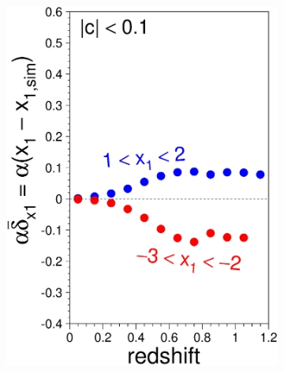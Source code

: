 \documentclass[11pt,a4paper]{paper}
\begin{document}
\begin{figure}[htbp!]
\begin{subfigure}[t]{.20\linewidth}
        \includegraphics[width=\linewidth]{Answer_figures/Fig_biasCor_x1.eps}
    \end{subfigure}
    \begin{subfigure}[t]{.20\linewidth}
        \centering

\end{subfigure}
\end{figure}
\end{document}
